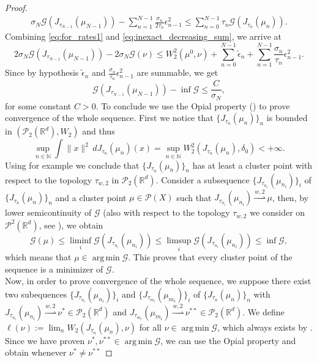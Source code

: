 \documentclass[11pt]{article}
\DeclareMathOperator*{\argmin}{arg\,min}
\newcommand{\cP}{\mathcal{P}}
\newcommand{\cG}{\mathcal{G}}
\newcommand{\R}{\mathbb{R}}
\newcommand{\N}{\mathbb{N}}
\newcommand{\wsto}{\overset{w,2}{\rightharpoonup}}
\numberwithin{equation}{section}
\begin{document}
\begin{proof}
\begin{equation}
		\begin{aligned}
			\sigma_{N}\cG(J_{\tau_{N-1}}(\mu_{N-1})) - \sum_{n=1}^{N-1}\frac{\sigma_n}{2\tau_n}\epsilon_{n-1}^2 \leq \sum_{n=0}^{N-1}\tau_n \cG(J_{\tau_n}(\mu_{n})).
		\end{aligned}
	\end{equation}
	Combining \eqref{eq:for_rates1} and \eqref{eq:inexact_decreasing_sum}, we arrive at
	\begin{equation}\label{eq:for_rates2}
		2\sigma_{N}\cG(J_{\tau_{N-1}}(\mu_{N-1})) - 2\sigma_N \cG(\nu)\leq W_2^2(\mu^0,\nu)+\sum_{n=0}^{N-1}\tilde{\epsilon}_n + \sum_{n=1}^{N-1}\frac{\sigma_n}{\tau_n}\epsilon_{n-1}^2.
	\end{equation}
	Since by hypothesis $\tilde{\epsilon}_n$ and  $\frac{\sigma_n}{\tau_n}\epsilon_{n-1}^2$ are summable, we get
	\begin{equation}\label{eq:rate_Jmun}
		\cG(J_{\tau_{N-1}}(\mu_{N-1})) - \inf \cG \leq \frac{C}{\sigma_N},
	\end{equation}
	for some constant $C>0$. To conclude we use the Opial property () to prove convergence of the whole sequence. First we notice that $\{J_{\tau_n}(\mu_n)\}_n$ is bounded in $(\cP_2(\R^d),W_2)$ and thus \[\sup_{n\in \N} \int \|x\|^2 \, d J_{\tau_n}(\mu_n)(x)= \sup_{n\in \N} W_2^2(J_{\tau_n}(\mu_n),\delta_0) < +\infty.\]
	Using for example \cite[Corollary 3.6 (c)]{NS2021} we conclude that $\{J_{\tau_n}(\mu_n)\}_n$ has at least a cluster point with respect to the topology $\tau_{w,2}$ in $\cP_2(\R^d)$.
	Consider a subsequence $\{J_{\tau_{n_i}}(\mu_{n_i})\}_i$ of $\{J_{\tau_n}(\mu_n)\}_n$ and a cluster point $\mu\in \cP(X)$ such that $J_{\tau_{n_i}}(\mu_{n_i})\wsto \mu$, then, by lower semicontinuity of $\cG$ (also with respect to the topology $\tau_{w,2}$ we consider on $\mathcal{P}^2(\R^d)$, see ), we obtain
	\[\cG(\mu)\leq \liminf_i \cG(J_{\tau_{n_i}}(\mu_{n_i}))\leq \limsup_i \cG(J_{\tau_{n_i}}(\mu_{n_i})) \leq \inf \cG,\]
	which means that $\mu \in \argmin \cG$. This proves that every cluster point of the sequence is a minimizer of $\cG$.\\
	Now, in order to prove convergence of the whole sequence, we suppose there exist two subequences $\{J_{\tau_{n_i}}(\mu_{n_i})\}_i$ and $\{J_{\tau_{m_i}}(\mu_{m_i})\}_i$ of $\{J_{\tau_n}(\mu_n)\}_n$ with $J_{\tau_{n_i}}(\mu_{n_i})\wsto\nu^*\in \cP_2(\R^d)$ and $J_{\tau_{m_i}}(\mu_{m_i})\wsto\nu^{**}\in \cP_2(\R^d)$. We define $\ell(\nu):= \lim_n W_2(J_{\tau_n}(\mu_n),\nu)$ for all $\nu \in \argmin \cG$, which always exists by . Since we have proven $\nu^*, \nu^{**}\in \argmin \cG$, we can use the Opial property and obtain whenever $\nu^*\neq\nu^{**}$

\end{proof}
\end{document}
